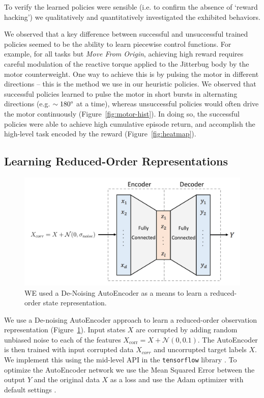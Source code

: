 \documentclass[letterpaper, 10 pt, conference]{ieeeconf}
\begin{document}
To verify the learned policies were sensible (i.e. to confirm the absence of `reward hacking') we qualitatively and quantitatively investigated the exhibited behaviors.

We observed that a key difference between successful and unsuccessful trained policies seemed to be the ability to learn piecewise control functions.
For example, for all tasks but \emph{Move From Origin}, achieving high reward requires careful modulation of the reactive torque applied to the Jitterbug body by the motor counterweight.
One way to achieve this is by pulsing the motor in different directions -- this is the method we use in our heuristic policies.
We observed that successful policies learned to pulse the motor in short bursts in alternating directions (e.g. $\sim180\degree$ at a time), whereas unsuccessful policies would often drive the motor continuously (Figure~\ref{fig:motor-hist}).
In doing so, the successful policies were able to achieve high cumulative episode return, and accomplish the high-level task encoded by the reward (Figure~\ref{fig:heatmap}).

\subsection{Learning Reduced-Order Representations}

\begin{figure}[t]
    \centering
    \includegraphics[width=\linewidth]{fig-autoencoder}
    \caption{
        WE used a De-Noising AutoEncoder as a means to learn a reduced-order state representation.
    }
    \label{fig:autoencoder}
\end{figure}

We use a De-noising AutoEncoder approach to learn a reduced-order observation representation (Figure~\ref{fig:autoencoder}).
Input states $X$ are corrupted by adding random unbiased noise to each of the features $X_\text{corr} = X + \mathcal{N}(0, 0.1)$.
The AutoEncoder is then trained with input corrupted data $X_{corr}$ and uncorrupted target labels $X$.
We implement this using the mid-level API in the \texttt{tensorflow} library \cite{Abadi2015Tensorflow}.
To optimize the AutoEncoder network we use the Mean Squared Error between the output $Y$ and the original data $X$ as a loss and use the Adam optimizer with default settings \cite{Adam}.
\end{document}
